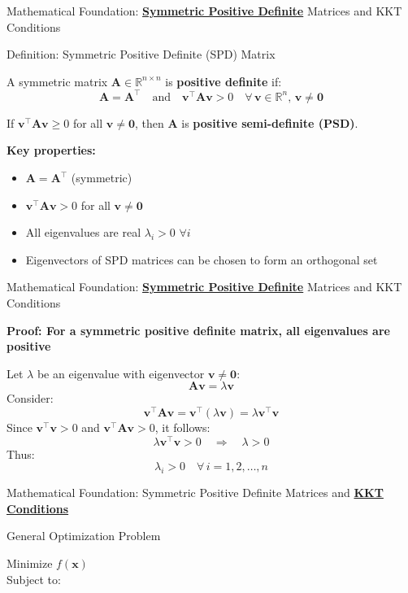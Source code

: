 \documentclass{beamer}
\begin{document}
\begin{frame}{Mathematical Foundation: \textbf{\underline{Symmetric Positive Definite}} Matrices and KKT Conditions}

\begin{block}{Definition: Symmetric Positive Definite (SPD) Matrix}

A symmetric matrix $\bm{A} \in \mathbb{R}^{n \times n}$ is \textbf{positive definite} if:
\[
\bm{A} = \bm{A}^\top \quad \text{and} \quad \bm{v}^\top \bm{A} \bm{v} > 0 \quad \forall \, \bm{v} \in \mathbb{R}^n, \, \bm{v} \neq \bm{0}
\]

If $\bm{v}^\top \bm{A} \bm{v} \geq 0$ for all $\bm{v} \neq \bm{0}$, then $\bm{A}$ is \textbf{positive semi-definite (PSD)}.

\vspace{0.3cm}

\textbf{Key properties:}
\begin{itemize}
    \item $\bm{A} = \bm{A}^\top$ (symmetric)
    \item $\bm{v}^\top \bm{A} \bm{v} > 0$ for all $\bm{v} \neq \bm{0}$
    \item All eigenvalues are real $\lambda_i > 0$ $\forall i$
    \item Eigenvectors of SPD matrices can be chosen to form an orthogonal set
\end{itemize}

\end{block}

\end{frame}

\begin{frame}{Mathematical Foundation: \textbf{\underline{Symmetric Positive Definite}} Matrices and KKT Conditions}

\textbf{Proof: For a symmetric positive definite matrix, all eigenvalues are positive}

Let $\lambda$ be an eigenvalue with eigenvector $\bm{v} \neq \bm{0}$:
\[
\bm{A} \bm{v} = \lambda \bm{v}
\]
Consider:
\[
\bm{v}^\top \bm{A} \bm{v} = \bm{v}^\top (\lambda \bm{v}) = \lambda \bm{v}^\top \bm{v}
\]
Since $\bm{v}^\top \bm{v} > 0$ and $\bm{v}^\top \bm{A} \bm{v} > 0$, it follows:
\[
\lambda \bm{v}^\top \bm{v} > 0 \quad \Rightarrow \quad \lambda > 0
\]
Thus:
\[
\boxed{\lambda_i > 0 \quad \forall \, i = 1,2,\dots, n}
\]

\end{frame}


\begin{frame}{Mathematical Foundation: Symmetric Positive Definite Matrices and \textbf{\underline{KKT Conditions}}}

\begin{block} {General Optimization Problem}

Minimize $f(\bm{x})$\\
Subject to:

    
\end{block}

\end{frame}
\end{document}
